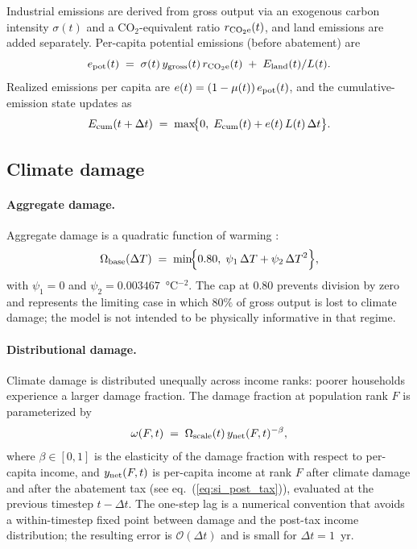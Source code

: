 Industrial emissions are derived from gross output via an exogenous carbon intensity $\sigma(t)$ and a CO$_2$-equivalent ratio $r_{\rm CO_2e}(t)$, and land emissions are added separately.  Per-capita potential emissions (before abatement) are
\begin{equation}\label{eq:si_epot}
e_{\rm pot}(t) \;=\; \sigma(t)\, y_{\rm gross}(t)\, r_{\rm CO_2e}(t) \;+\; E_{\rm land}(t)/L(t). %
\end{equation}
Realized emissions per capita are $e(t) = (1-\mu(t))\,e_{\rm pot}(t)$, and the cumulative-emission state updates as
\begin{equation}
E_{\rm cum}(t + \Delta t) \;=\; \max\!\bigl\{0,\; E_{\rm cum}(t) + e(t)\,L(t)\,\Delta t\bigr\}. %
\end{equation}

\subsection*{Climate damage}\label{si:damage}

\paragraph{Aggregate damage.}  Aggregate damage is a quadratic function of warming \citep{Barrage2024}:
\begin{equation}\label{eq:si_omega_base}
\Omega_{\rm base}(\Delta T) \;=\; \min\!\Bigl\{0.80,\; \psi_1\, \Delta T + \psi_2\, \Delta T^{2}\Bigr\}, %
\end{equation}
with $\psi_1 = 0$ and $\psi_2 = 0.003467$~\si{\celsius}$^{-2}$.  The cap at $0.80$ prevents division by zero and represents the limiting case in which $80\%$ of gross output is lost to climate damage; the model is not intended to be physically informative in that regime.

\paragraph{Distributional damage.}  Climate damage is distributed unequally across income ranks: poorer households experience a larger damage fraction.  The damage fraction at population rank $F$ is parameterized by
\begin{equation}\label{eq:si_omega_F}
\omega(F, t) \;=\; \Omega_{\rm scale}(t)\, y_{\rm net}(F, t)^{-\beta}, %
\end{equation}
where $\beta \in [0,1]$ is the elasticity of the damage fraction with respect to per-capita income, and $y_{\rm net}(F,t)$ is per-capita income at rank $F$ after climate damage and after the abatement tax (see eq.~(\ref{eq:si_post_tax})), evaluated at the previous timestep $t - \Delta t$.  The one-step lag is a numerical convention that avoids a within-timestep fixed point between damage and the post-tax income distribution; the resulting error is $\mathcal{O}(\Delta t)$ and is small for $\Delta t = 1$~yr.

